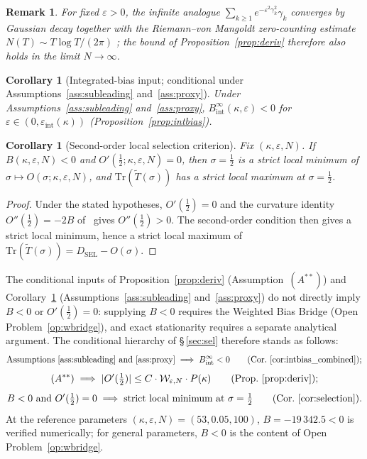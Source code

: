 \documentclass[11pt]{article}
\newtheorem{corollary}[theorem]{Corollary}
\newtheorem*{remark}{Remark}
\newcommand{\Tt}{\widetilde{T}}
\newcommand{\DSEL}{D_{\mathrm{SEL}}}
\newcommand{\Wgamma}{\mathcal{W}_{\varepsilon,N}}   %
\newcommand{\Astar}{\ensuremath{(A^{**})}}  %
\begin{document}
\begin{remark}
For fixed $\varepsilon>0$, the infinite analogue
$\sum_{k\ge 1}e^{-\varepsilon^2\gamma_k^2}\gamma_k$
converges by Gaussian decay together with the Riemann--von Mangoldt
zero-counting estimate $N(T)\sim T\log T/(2\pi)$
\cite[Thm.\,5.8]{IwaniecKowalski04}; the bound of
Proposition~\ref{prop:deriv} therefore also holds in the limit $N\to\infty$.
\end{remark}

\begin{corollary}[Integrated-bias input; conditional under
  Assumptions~\ref{ass:subleading} and~\ref{ass:proxy}]
\label{cor:intbias_combined}
Under Assumptions~\ref{ass:subleading} and~\ref{ass:proxy},
$B_{\mathrm{int}}^\infty(\kappa,\varepsilon)<0$ for
$\varepsilon\in(0,\varepsilon_{\mathrm{int}}(\kappa))$
(Proposition~\ref{prop:intbias}).
\end{corollary}

\begin{corollary}[Second-order local selection criterion]
\label{cor:selection}
Fix $(\kappa,\varepsilon,N)$. If $B(\kappa,\varepsilon,N)<0$ and
$O'(\tfrac12;\kappa,\varepsilon,N)=0$, then $\sigma=\tfrac12$ is a
strict local minimum of
$\sigma\mapsto O(\sigma;\kappa,\varepsilon,N)$, and
$\mathrm{Tr}(\Tt(\sigma))$ has a strict local maximum
at $\sigma=\tfrac12$.
\end{corollary}

\begin{proof}
Under the stated hypotheses, $O'(\tfrac12)=0$ and the curvature
identity $O''(\tfrac12)=-2B$ of~\cite{Paper6} gives
$O''(\tfrac12)>0$.
The second-order condition then gives a strict local minimum,
hence a strict local maximum of
$\mathrm{Tr}(\Tt(\sigma))=\DSEL-O(\sigma)$.
\end{proof}

The conditional inputs of Proposition~\ref{prop:deriv}
(Assumption~\Astar) and Corollary~\ref{cor:intbias_combined}
(Assumptions~\ref{ass:subleading} and~\ref{ass:proxy}) do not
directly imply $B<0$ or $O'(\tfrac12)=0$: supplying $B<0$
requires the Weighted Bias Bridge (Open Problem~\ref{op:wbridge}),
and exact stationarity requires a separate analytical argument.
The conditional hierarchy of \S\,\ref{sec:sel} therefore stands
as follows:
\[
\text{Assumptions~\ref{ass:subleading} and~\ref{ass:proxy}}
  \;\Longrightarrow\; B_{\mathrm{int}}^\infty<0
  \qquad\text{(Cor.~\ref{cor:intbias_combined})};
\]
\[
\Astar \;\Longrightarrow\; |O'(\tfrac12)|\le C\cdot\Wgamma\cdot P(\kappa)
  \qquad\text{(Prop.~\ref{prop:deriv})};
\]
\[
B<0 \text{ and } O'(\tfrac12)=0
  \;\Longrightarrow\; \text{strict local minimum at }\sigma=\tfrac12
  \qquad\text{(Cor.~\ref{cor:selection})}.
\]
At the reference parameters $(\kappa,\varepsilon,N)=(53,0.05,100)$,
$B=-19\,342.5<0$ is verified numerically; for general parameters,
$B<0$ is the content of Open Problem~\ref{op:wbridge}.
\end{document}

